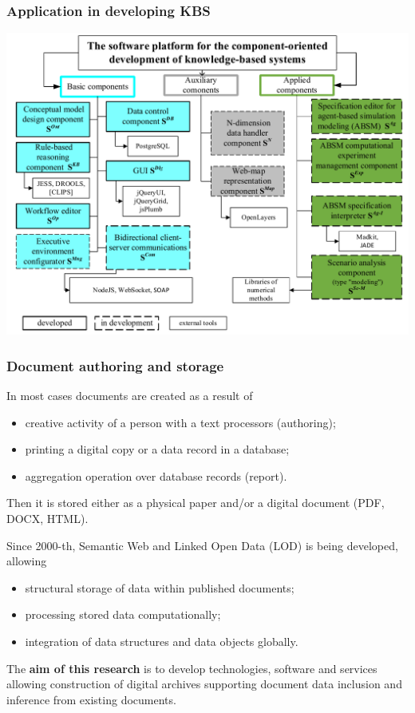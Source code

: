 \documentclass[10pt]{beamer}
\begin{document}
\begin{frame}
  \frametitle{Application in developing KBS}
  \begin{center}
  \includegraphics[width=0.9\linewidth]{kbs-stolboff.pdf}
\end{center}
\end{frame}

\begin{frame}
  \frametitle{Document authoring and storage}
  In most cases documents are created as a result of
  \begin{itemize}
  \item creative activity of a person with a text processors (authoring);
  \item printing a digital copy or a data record in a database;
  \item aggregation operation over database records (report).
  \end{itemize}
  Then it is stored either as a physical paper and/or a digital document (PDF, DOCX, HTML).

  Since 2000-th, Semantic Web and Linked Open Data (LOD) is being developed, allowing
  \begin{itemize}
  \item structural storage of data within published documents;
  \item processing stored data computationally;
  \item integration of data structures and data objects globally.
  \end{itemize}

  The \textbf{aim of this research} is to develop technologies, software and services allowing construction of digital archives supporting document data inclusion and inference from existing documents.
\end{frame}
\end{document}
